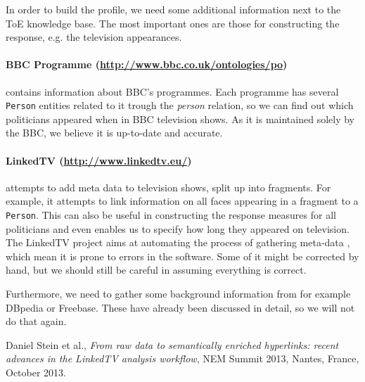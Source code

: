 \documentclass[12pt,a4paper]{article}
\begin{document}
In order to build the profile, we need some additional information next to the ToE knowledge base. The most important ones are those for constructing the response, e.g. the television appearances.

\paragraph{BBC Programme (\url{http://www.bbc.co.uk/ontologies/po})} contains information about BBC's programmes. Each programme has several \texttt{Person} entities related to it trough the \emph{person} relation, so we can find out which politicians appeared when in BBC television shows. As it is maintained solely by the BBC, we believe it is up-to-date and accurate.

\paragraph{LinkedTV (\url{http://www.linkedtv.eu/})} attempts to add meta data to television shows, split up into fragments. For example, it attempts to link information on all faces appearing in a fragment to a \texttt{Person}. This can also be useful in constructing the response measures for all politicians and even enables us to specify how long they appeared on television. The LinkedTV project aims at automating the process of gathering meta-data \cite{stein13}, which mean it is prone to errors in the software. Some of it might be corrected by hand, but we should still be careful in assuming everything is correct.

\vspace{.5cm}
\par Furthermore, we need to gather some background information from for example DBpedia or Freebase. These have already been discussed in detail, so we will not do that again. 

\begin{thebibliography}{9}

   Daniel Stein et al.,
  \emph{From raw data to semantically enriched hyperlinks: recent advances in the LinkedTV
analysis workflow},
  NEM Summit 2013,  
  Nantes, France,
  October 2013.

\end{thebibliography}
\end{document}
